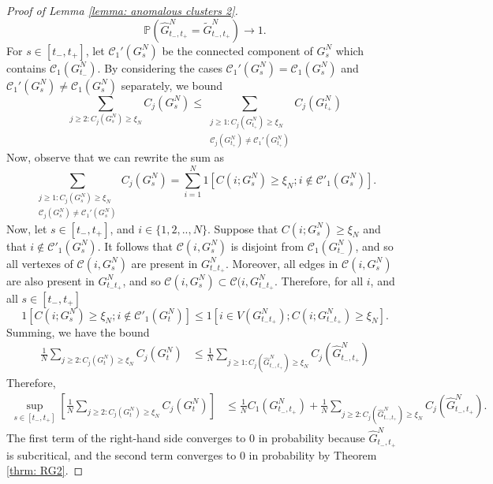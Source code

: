 \begin{proof}[Proof of Lemma \ref{lemma: anomalous clusters 2}]
\begin{equation}
    \mathbb{P}\left(\widehat{G}^N_{t_-, t_+}=\widetilde{G}^N_{t_-, t_+}\right)\rightarrow 1.
\end{equation} For $s\in [t_-, t_+]$, let $\mathcal{C}_1'(G^N_s)$ be the connected component of $G^N_s$ which contains $\mathcal{C}_1(G^N_{t_-})$. By considering the cases $\mathcal{C}_1'(G^N_s)=\mathcal{C}_1(G^N_s)$ and $\mathcal{C}_1'(G^N_s)\neq \mathcal{C}_1(G^N_s)$ separately, we bound \begin{equation}
    \sum_{j\geq 2: C_j(G^N_s)\geq \xi_N} C_j(G^N_s) \leq \sum_{\substack{j\geq 1: C_j(G^N_{t_+})\geq \xi_N \\ \mathcal{C}_j(G^N_{t_+})\neq \mathcal{C}_1'(G^N_{t_+})}} C_j(G^N_{t_+})
\end{equation} Now, observe that we can rewrite the sum as \begin{equation}
    \sum_{\substack{j\geq 1: C_j(G^N_s)\geq \xi_N \\ \mathcal{C}_j(G^N_s)\neq \mathcal{C}_1'(G^N_s)}}  C_j(G^N_s) = \sum_{i=1}^N 1[C(i; G^N_s)\geq \xi_N; i \not \in \mathcal{C}'_1(G^N_s)].
\end{equation}  Now, let $s\in [t_-, t_+]$, and $i\in\{1, 2,..,N\}$. Suppose that $C(i; G^N_s)\geq \xi_N$ and that $i \not \in \mathcal{C}'_1(G^N_s)$. It follows that $\mathcal{C}(i, G^N_s)$ is disjoint from $\mathcal{C}_1(G^N_{t_-})$, and so all vertexes of $\mathcal{C}(i, G^N_s)$ are present in $G^N_{t_-t_+}$. Moreover, all edges in $\mathcal{C}(i, G^N_s)$ are also present in $G^N_{t_-t_+}$, and so $\mathcal{C}(i, G^N_s) \subset \mathcal{C}(i, G^N_{t_-t_+}$. Therefore, for all $i$, and all $s\in [t_-, t_+]$ \begin{equation}
    1[C(i; G^N_s)\geq \xi_N; i \not \in \mathcal{C}'_1(G^N_t)] \leq 1[i \in V(G^N_{t_-t_+}); C(i; G^N_{t_-t_+})\geq \xi_N].
\end{equation} Summing, we have the bound \begin{equation}\begin{split}
\frac{1}{N}\sum_{j\geq 2: C_j(G^N_t)\geq \xi_N} C_j(G^N_t) & \leq \frac{1}{N}\sum_{j\geq 1: C_j(\widehat{G}^N_{t_-,t_+})\geq \xi_N} C_j(\widehat{G}^N_{t_-,t_+}) 
\end{split} \end{equation} Therefore, \begin{equation}\begin{split}
    \sup_{s\in [t_-, t_+]} \left[\frac{1}{N}\sum_{j\geq 2: C_j(G^N_t)\geq \xi_N} C_j(G^N_t)\right] & \leq \frac{1}{N}C_1(G^N_{t_-, t_+})+\frac{1}{N}\sum_{j\geq 2: C_j(\widehat{G}^N_{t_-,t_+})\geq \xi_N} C_j(\widehat{G}^N_{t_-,t_+}).
\end{split} \end{equation} The first term of the right-hand side converges to $0$ in probability  because $\widehat{G}^N_{t_-,t_+}$ is subcritical, and the second term converges to $0$ in probability by Theorem \ref{thrm: RG2}. \end{proof} 
